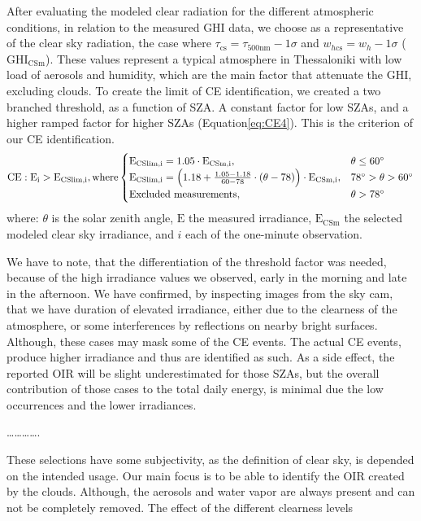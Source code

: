 \documentclass[
]{article}
\begin{document}
After evaluating the modeled clear radiation for the different atmospheric
conditions, in relation to the measured GHI data, we choose as a representative of
the clear sky radiation, the case where
\(\tau_{\text{cs}} = \tau_{500\text{nm}} - 1\sigma\) and \(w_{h\text{cs}} = w_h - 1\sigma\)
(\(\text{GHI}_\text{CSm}\)).
These values represent a typical atmosphere in Thessaloniki with low load of aerosols
and humidity, which are the main factor that attenuate the GHI, excluding clouds. To
create the limit of CE identification, we created a two branched threshold, as a
function of SZA. A constant factor for low SZAs, and a higher ramped factor for
higher SZAs (Equation\nobreakspace\ref{eq:CE4}).
This is the criterion of our CE identification.
\begin{equation}
\text{CE} : \text{E}_\text{i} > \text{E}_\text{CSlim,i}, \text{where} \begin{cases}
 \text{E}_\text{CSlim,i} = 1.05 \cdot \text{E}_\text{CSm,i}, & \text{$\theta \leq 60^\circ$}\\
\text{E}_\text{CSlim,i} = \left ({ 1.18 + \frac{1.05 - 1.18}{60 - 78} \cdot (\theta- 78) } \right ) \cdot \text{E}_\text{CSm,i}, & \text{$ 78^\circ > \theta > 60^\circ$}\\
\text{Excluded measurements}, & \theta > 78^\circ
\end{cases}\label{eq:CE4}
\end{equation}
where: \(\theta\) is the solar zenith angle, \(\text{E}\) the measured
irradiance, \(\text{E}_\text{CSm}\) the selected modeled clear sky irradiance, and \(i\) each of the one-minute observation.

We have to note, that the differentiation of the threshold factor was needed, because
of the high irradiance values we observed, early in the morning and late in the
afternoon. We have confirmed, by inspecting images from the sky cam, that we have
duration of elevated irradiance, either due to the clearness of the atmosphere, or some
interferences by reflections on nearby bright surfaces. Although, these cases may
mask some of the CE events. The actual CE events, produce higher irradiance and thus
are identified as such. As a side effect, the reported OIR will be slight
underestimated for those SZAs, but the overall contribution of those cases to the
total daily energy, is minimal due the low occurrences and the lower irradiances.

\ldots\ldots\ldots\ldots.

These selections have some subjectivity, as the definition of clear sky, is depended
on the intended usage. Our main focus is to be able to identify the OIR created by the
clouds. Although, the aerosols and water vapor are always present and can not be
completely removed.
The effect of the different clearness levels
\end{document}
